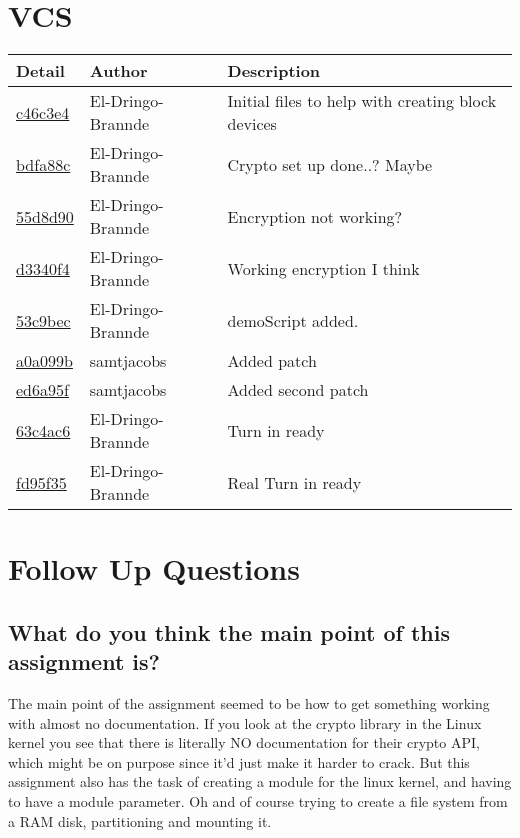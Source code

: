 \documentclass{article}
\begin{document}
\section{VCS}
\begin{tabular}{l l l}\textbf{Detail} & \textbf{Author} & \textbf{Description}\\\hline

\href{https://github.com/El-Dringo-Brannde/CS444/commit/c46c3e440a2abcb5f7e84355b5f2edab285e31de}{c46c3e4} & El-Dringo-Brannde & Initial files to help with creating block devices\\\hline
\href{https://github.com/El-Dringo-Brannde/CS444/commit/bdfa88ccb79b211a4c40b5f265821ed239939cec}{bdfa88c} & El-Dringo-Brannde & Crypto set up done..? Maybe\\\hline
\href{https://github.com/El-Dringo-Brannde/CS444/commit/55d8d90d4e46f89dec05ccae1516ca4e5d92b735}{55d8d90} & El-Dringo-Brannde & Encryption not working?\\\hline
\href{https://github.com/El-Dringo-Brannde/CS444/commit/d3340f45a4840a2d1b276dd7cf42580253cc1db4}{d3340f4} & El-Dringo-Brannde & Working encryption I think\\\hline
\href{https://github.com/El-Dringo-Brannde/CS444/commit/53c9bec7d0583d604b5ece65864842ad30888efb}{53c9bec} & El-Dringo-Brannde & demoScript added.\\\hline
\href{https://github.com/El-Dringo-Brannde/CS444/commit/a0a099bddd20a21b5104594707e44884df971960}{a0a099b} & samtjacobs & Added patch\\\hline
\href{https://github.com/El-Dringo-Brannde/CS444/commit/ed6a95fc195482af99967438b6687be657c6f321}{ed6a95f} & samtjacobs & Added second patch\\\hline
\href{https://github.com/El-Dringo-Brannde/CS444/commit/63c4ac698b89e7fa9a4debcca9cc855f465e8992}{63c4ac6} & El-Dringo-Brannde & Turn in ready\\\hline
\href{https://github.com/El-Dringo-Brannde/CS444/commit/fd95f355d9040b722828c25c5dbf72e11b9bdab0}{fd95f35} & El-Dringo-Brannde & Real Turn in ready\\\hline\end{tabular}


\section{Follow Up Questions}
\subsection{What do you think the main point of this assignment is?}
    The main point of the assignment seemed to be how to get something working with almost no documentation. If you look at the crypto library in the Linux kernel you see that there is literally NO documentation for their crypto API, which might be on purpose since it’d just make it harder to crack.
    But this assignment also has the task of creating a module for the linux kernel, and having to have a module parameter.
    Oh and of course trying to create a file system from a RAM disk, partitioning and mounting it.
\end{document}
